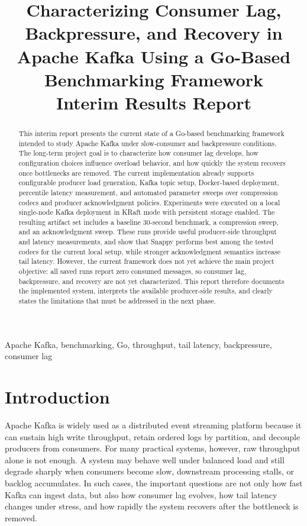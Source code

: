 \documentclass[conference]{IEEEtran}
\title{Characterizing Consumer Lag, Backpressure, and Recovery in Apache Kafka Using a Go-Based Benchmarking Framework\\Interim Results Report}
\author{
\IEEEauthorblockN{Author Name}
\IEEEauthorblockA{Replace with course, institution, and email}
}
\begin{document}
\maketitle

\begin{abstract}
This interim report presents the current state of a Go-based benchmarking framework intended to study Apache Kafka under slow-consumer and backpressure conditions. The long-term project goal is to characterize how consumer lag develops, how configuration choices influence overload behavior, and how quickly the system recovers once bottlenecks are removed. The current implementation already supports configurable producer load generation, Kafka topic setup, Docker-based deployment, percentile latency measurement, and automated parameter sweeps over compression codecs and producer acknowledgment policies. Experiments were executed on a local single-node Kafka deployment in KRaft mode with persistent storage enabled. The resulting artifact set includes a baseline 30-second benchmark, a compression sweep, and an acknowledgment sweep. These runs provide useful producer-side throughput and latency measurements, and show that Snappy performs best among the tested codecs for the current local setup, while stronger acknowledgment semantics increase tail latency. However, the current framework does not yet achieve the main project objective: all saved runs report zero consumed messages, so consumer lag, backpressure, and recovery are not yet characterized. This report therefore documents the implemented system, interprets the available producer-side results, and clearly states the limitations that must be addressed in the next phase.
\end{abstract}

\begin{IEEEkeywords}
Apache Kafka, benchmarking, Go, throughput, tail latency, backpressure, consumer lag
\end{IEEEkeywords}

\section{Introduction}
Apache Kafka is widely used as a distributed event streaming platform because it can sustain high write throughput, retain ordered logs by partition, and decouple producers from consumers. For many practical systems, however, raw throughput alone is not enough. A system may behave well under balanced load and still degrade sharply when consumers become slow, downstream processing stalls, or backlog accumulates. In such cases, the important questions are not only how fast Kafka can ingest data, but also how consumer lag evolves, how tail latency changes under stress, and how rapidly the system recovers after the bottleneck is removed.
\end{document}
